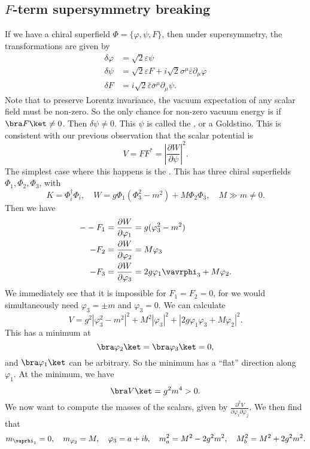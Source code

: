\documentclass[a4paper]{article}
\begin{document}
\subsection{\texorpdfstring{$F$}{F}-term supersymmetry breaking}
If we have a chiral superfield $\Phi = \{\varphi, \psi, F\}$, then under supersymmetry, the transformations are given by
\begin{align*}
  \delta \varphi &= \sqrt{2} \varepsilon \psi\\
  \delta \psi &= \sqrt{2} \varepsilon F + i \sqrt{2} \sigma^\mu \bar{\varepsilon} \partial_\mu \varphi\\
  \delta F &= i \sqrt{2} \bar{\varepsilon} \bar{\sigma}^\mu \partial_\mu \psi.
\end{align*}
Note that to preserve Lorentz invariance, the vacuum expectation of any scalar field must be non-zero. So the only chance for non-zero vacuum energy is if $\bra F\ket \not= 0$. Then $\delta \psi \not= 0$. This $\psi$ is called the , or a Goldstino. This is consistent with our previous observation that the scalar potential is
\[
  V = FF^* = \left| \frac{\partial W}{\partial \psi} \right|^2.
\]
The simplest case where this happens is the . This has three chiral superfields $\Phi_1, \Phi_2, \Phi_3$, with
\[
  K = \Phi_i^\dagger \Phi_i,\quad W = g \Phi_1( \Phi_3^2 - m^2) + M \Phi_2 \Phi_3,\quad M \gg m \not= 0.
\]
Then we have
\begin{align*}
  --F_1 &= \frac{\partial W}{\partial \varphi_1} = g (\varphi_3^2 - m^2)\\
  - F_2 &= \frac{\partial W}{\partial \varphi_2} = M \varphi_3\\
  - F_3 &= \frac{\partial W}{\partial \varphi_3} = 2g \varphi_1 \vavrphi_3 + M \varphi_2.
\end{align*}
We immediately see that it is impossible for $F_1 = F_2 = 0$, for we would simultaneously need $\varphi_3 = \pm m$ and $\varphi_3 = 0$. We can calculate
\[
  V = g^2 |\varphi_3^2 - m^2|^2 + M^2 |\varphi_3|^2 + |2g \varphi_1 \varphi_3 + M \varphi_2|^2.
\]
This has a minimum at
\[
  \bra \varphi_2\ket = \bra \varphi_3\ket = 0,
\]
and $\bra \varphi_1\ket$ can be arbitrary. So the minimum has a ``flat'' direction along $\varphi_1$. At the minimum, we have
\[
  \bra V\ket = g^2 m^4 > 0.
\]
We now want to compute the masses of the scalars, given by $\frac{\partial^2 V}{\partial \varphi_i \partial \varphi_j}$. We then find that
\[
  m_{\vaprhi_1} = 0,\quad m_{\varphi_2} = M,\quad \varphi_3 = a + ib,\quad m_a^2 = M^2 - 2g^2 m^2,\quad M_b^2 = M^2 + 2 g^2 m^2. %
\]
\end{document}
